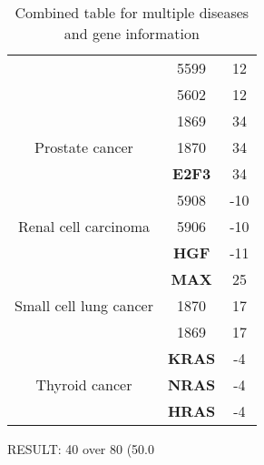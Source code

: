 \begin{table}[h!]
\begin{tabular}{|c|c|c|}
    \cline{2-3} & 5599 & 12 \\
    
    \cline{2-3} & 5602 & 12 \\
    \hline\multirow{3}{*}{Prostate cancer} & 1869 & 34 \\ 

    \cline{2-3} & 1870 & 34 \\
    
    \cline{2-3} & \textbf{E2F3} & 34 \\
    \hline\multirow{3}{*}{Renal cell carcinoma} & 5908 & -10 \\ 

    \cline{2-3} & 5906 & -10 \\
    
    \cline{2-3} & \textbf{HGF} & -11 \\
    \hline\multirow{3}{*}{Small cell lung cancer} & \textbf{MAX} & 25 \\ 

    \cline{2-3} & 1870 & 17 \\
    
    \cline{2-3} & 1869 & 17 \\
    \hline\multirow{3}{*}{Thyroid cancer} & \textbf{KRAS} & -4 \\ 

    \cline{2-3} & \textbf{NRAS} & -4 \\
    
    \cline{2-3} & \textbf{HRAS} & -4 \\
    \hline
    \end{tabular}
    \caption{Combined table for multiple diseases and gene information}
    \label{tab:combined}
\end{table}
        RESULT: 40 over 80 (50.0%